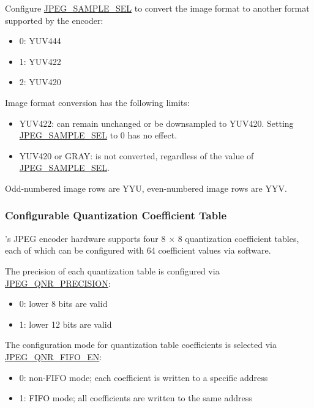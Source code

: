 \documentclass[main\_\_EN.tex]{subfiles}
\begin{document}
\begin{table}[H]
\begin{threeparttable}
    \begin{tablenotes}
        \item[1] Configure \hyperref[fielddesc:JPEGSAMPLESEL]{JPEG\_SAMPLE\_SEL} to convert the image format to another format supported by the encoder:
        \begin{itemize}
            \item 0: YUV444
            \item 1: YUV422
            \item 2: YUV420
        \end{itemize}
        \item[2] Image format conversion has the following limits:
        \begin{itemize}
            \item YUV422: can remain unchanged or be downsampled to YUV420. Setting \hyperref[fielddesc:JPEGSAMPLESEL]{JPEG\_SAMPLE\_SEL} to 0 has no effect.
            \item YUV420 or GRAY: is not converted, regardless of the value of \hyperref[fielddesc:JPEGSAMPLESEL]{JPEG\_SAMPLE\_SEL}.
        \end{itemize}
        \item[3] Odd-numbered image rows are YYU, even-numbered image rows are YYV.
    \end{tablenotes}

    \end{threeparttable}
\end{table}


\subsubsection{Configurable Quantization Coefficient Table}
\label{sec:jpegcodec-enc-qnr}

\chipname{}'s JPEG encoder hardware supports four 8 × 8 quantization coefficient tables, each of which can be configured with 64 coefficient values via software.

The precision of each quantization table is configured via \hyperref[fielddesc:JPEGQNRPRECISION]{JPEG\_QNR\_PRECISION}:
\begin{itemize}
    \item 0: lower 8 bits are valid
    \item 1: lower 12 bits are valid
\end{itemize}

The configuration mode for quantization table coefficients is selected via \hyperref[fielddesc:JPEGQNRFIFOEN]{JPEG\_QNR\_FIFO\_EN}:
\begin{itemize}
    \item 0: non-FIFO mode; each coefficient is written to a specific address
    \item 1: FIFO mode; all coefficients are written to the same address
\end{itemize}
\end{document}
